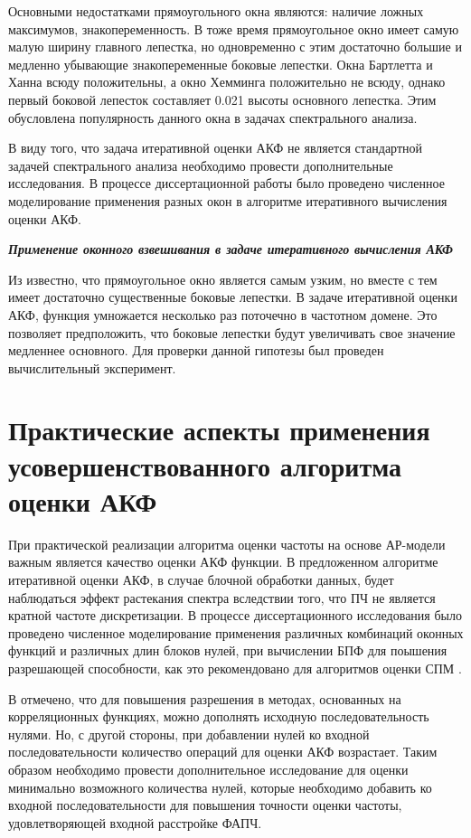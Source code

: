 Основными недостатками прямоугольного окна являются: наличие ложных максимумов, знакопеременность. В тоже время прямоугольное окно имеет самую малую ширину главного лепестка, но
одновременно с этим достаточно большие и медленно убывающие знакопеременные боковые лепестки. Окна Бартлетта и Ханна всюду положительны, а окно Хемминга положительно не всюду, однако
первый боковой лепесток составляет 0.021 высоты основного лепестка. Этим обусловлена популярность данного окна в задачах спектрального анализа.

В виду того, что задача итеративной оценки АКФ не является стандартной задачей спектрального анализа необходимо провести дополнительные исследования. В процессе
диссертационной работы было проведено численное моделирование применения разных окон в алгоритме итеративного вычисления оценки АКФ.

{\bf{\textit{Применение оконного взвешивания в задаче итеративного вычисления АКФ}}}

Из \cite{bolshakov-book} известно, что прямоугольное окно является самым узким, но вместе с тем имеет достаточно существенные боковые лепестки. В задаче итеративной оценки
АКФ, функция умножается несколько раз поточечно в частотном домене. Это позволяет предположить, что боковые лепестки будут увеличивать свое значение медленнее основного.
Для проверки данной гипотезы был проведен вычислительный эксперимент.

\section{Практические аспекты применения усовершенствованного алгоритма оценки АКФ}
\label{lab:sec2_windows}

При практической реализации алгоритма оценки частоты на основе АР-модели важным является качество оценки АКФ функции. В предложенном алгоритме итеративной оценки АКФ,
в случае блочной обработки данных, будет наблюдаться эффект растекания спектра вследствии того, что ПЧ не является кратной частоте дискретизации. В процессе диссертационного
исследования было проведено численное моделирование применения различных комбинаций оконных функций и различных длин блоков нулей, при вычислении БПФ для поышения
разрешающей способности, как это рекомендовано для алгоритмов оценки СПМ \cite{bolshakov-book}.

В \cite{bolshakov-book} отмечено, что для повышения разрешения в методах, основанных на корреляционных функциях, можно дополнять исходную последовательность нулями.
Но, с другой стороны, при добавлении нулей ко входной последовательности количество операций для оценки АКФ возрастает. Таким образом необходимо провести дополнительное
исследование для оценки минимально возможного количества нулей, которые необходимо добавить ко входной последовательности для повышения точности оценки частоты,
удовлетворяющей входной расстройке ФАПЧ.

